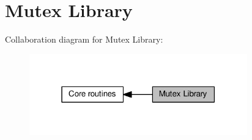 \hypertarget{group__APACHE__CORE__MUTEX}{}\section{Mutex Library}
\label{group__APACHE__CORE__MUTEX}
Collaboration diagram for Mutex Library\+:
\nopagebreak
\begin{figure}[H]
\begin{center}
\leavevmode
\includegraphics[width=267pt]{group__APACHE__CORE__MUTEX}
\end{center}
\end{figure}
